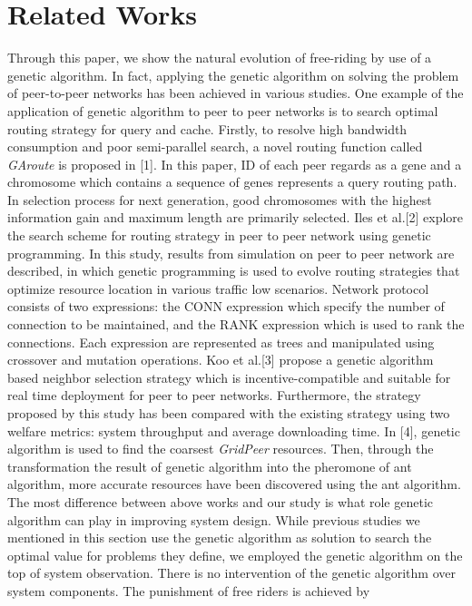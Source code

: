 \documentclass[12pt,journal,draftcls,letterpaper,onecolumn]{IEEEtran}
\begin{document}
\section{Related Works}\label{sec:related}

Through this paper, we show the natural evolution of free-riding by use of a genetic
algorithm. In fact, applying the genetic algorithm on solving the problem of peer-to-peer
networks has been achieved in various studies. One example of the application of genetic
algorithm to peer to peer networks is to search optimal routing strategy for query and cache.
Firstly, to resolve high bandwidth consumption and poor semi-parallel search, a novel routing
function called \emph{GAroute} is proposed in [1]. In this paper, ID of each peer regards as a gene
and a chromosome which contains a sequence of genes represents a query routing path. In
selection process for next generation, good chromosomes with the highest information gain
and maximum length are primarily selected. Iles et al.[2] explore the search scheme for
routing strategy in peer to peer network using genetic programming. In this study, results
from simulation on peer to peer network are described, in which genetic programming is used
to evolve routing strategies that optimize resource location in various traffic low scenarios.
Network protocol consists of two expressions: the CONN expression which specify the
number of connection to be maintained, and the RANK expression which is used to rank the
connections. Each expression are represented as trees and manipulated using crossover and
mutation operations.
Koo et al.[3] propose a genetic algorithm based neighbor selection strategy which is
incentive-compatible and suitable for real time deployment for peer to peer networks.
Furthermore, the strategy proposed by this study has been compared with the existing
strategy using two welfare metrics: system throughput and average downloading time. In [4],
genetic algorithm is used to find the coarsest \emph{GridPeer} resources. Then, through the
transformation the result of genetic algorithm into the pheromone of ant algorithm, more
accurate resources have been discovered using the ant algorithm.
The most difference between above works and our study is what role genetic algorithm can
play in improving system design. While previous studies we mentioned in this section use the
genetic algorithm as solution to search the optimal value for problems they define, we
employed the genetic algorithm on the top of system observation. There is no intervention of
the genetic algorithm over system components. The punishment of free riders is achieved by
\end{document}
